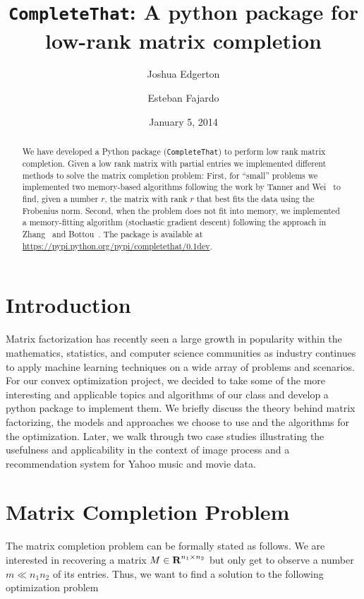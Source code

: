 \documentclass[12pt]{article}
\title{\texttt{CompleteThat}: A python package for  low-rank matrix completion}
\author{Joshua Edgerton \and Esteban Fajardo}
\date{January 5, 2014}
\begin{document}
\maketitle

\begin{abstract}
We have developed a Python package (\texttt{CompleteThat}) to perform low rank matrix completion. Given a low rank matrix with partial entries we implemented different methods to solve the matrix completion problem:  First, for ``small'' problems we implemented two memory-based algorithms  following the work by Tanner and Wei~\cite{Tanner:2014} to find, given a number $r$, the matrix with rank $r$ that best fits the data using the Frobenius norm. Second, when the problem does not fit into memory, we implemented a memory-fitting algorithm (stochastic gradient descent) following the approach in Zhang~\cite{zhang:2004} and Bottou~\cite{bottou:2012}. The package is available at \url{https://pypi.python.org/pypi/completethat/0.1dev}. 
\end{abstract}

\newpage
\tableofcontents
\newpage

\section{Introduction}
Matrix factorization has recently seen a large growth in popularity within the mathematics, statistics, and computer science communities as industry continues to apply machine learning techniques on a wide array of problems and scenarios. For our convex optimization project, we decided to take some of the more interesting and applicable topics and algorithms of our class and develop a python package to implement them. We briefly discuss the theory behind matrix factorizing, the models and approaches we choose to use and the algorithms for the optimization. Later, we walk through two case studies illustrating the usefulness and applicability in the context of image process and a recommendation system for Yahoo music and movie data. 

\section{Matrix Completion Problem}
The matrix completion problem can be formally stated as follows. We are interested in recovering a matrix $M \in {\mbox{\bf R}}^{n_1 \times n_2}$ but only get to observe a number $m \ll n_1n_2$ of its entries. Thus, we want to find a solution to the following optimization problem
\end{document}
